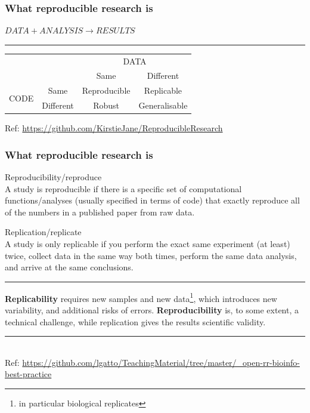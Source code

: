\documentclass{beamer}
\begin{document}

\begin{frame}
\frametitle{What reproducible research is}
\Large\centering $DATA +  ANALYSIS \rightarrow RESULTS$\\
\rule{\textwidth}{0.05pt}\vspace{20px}

\begin{table}[]
\centering
\begin{tabular}{cccc}
                                           &                                & \multicolumn{2}{c}{DATA}                          \\ \cline{3-4}
                                           & \multicolumn{1}{c|}{}          & Same         & \multicolumn{1}{c|}{Different}     \\ \cline{2-4}
\multicolumn{1}{c|}{\multirow{2}{*}{CODE}} & \multicolumn{1}{c|}{Same}      & Reproducible & \multicolumn{1}{c|}{Replicable}    \\
\multicolumn{1}{c|}{}                      & \multicolumn{1}{c|}{Different} & Robust       & \multicolumn{1}{c|}{Generalisable} \\ \cline{2-4}
\end{tabular}
\end{table}
\vspace{3px}
\tiny Ref: {\url{https://github.com/KirstieJane/ReproducibleResearch}}
\end{frame}


\begin{frame}
\frametitle{What reproducible research is}

\Large{Reproducibility/reproduce}\\
\footnotesize A study is reproducible if there is a specific set of computational functions/analyses (usually specified in terms of code) that exactly reproduce all of the numbers in a published paper from raw data.

\Large{Replication/replicate}\\
\footnotesize A study is only replicable if you perform the exact same experiment (at least) twice, collect data in the same way both times, perform the same data analysis, and arrive at the same conclusions.
\rule{\textwidth}{0.05pt}
{\bf Replicability} requires new samples and new data\footnote{\tiny{in particular biological replicates}}, which introduces new variability, and additional risks of errors. {\bf Reproducibility} is, to some extent, a technical challenge, while replication gives the results scientific validity.
\rule{\textwidth}{0.05pt}\\
\vspace{3px}
\tiny Ref: {\url{https://github.com/lgatto/TeachingMaterial/tree/master/_open-rr-bioinfo-best-practice}}
\end{frame}
\end{document}
